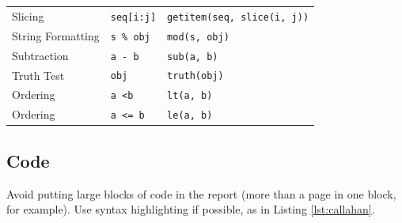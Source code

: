 \documentclass{l4proj}
\begin{document}
\begin{table}[]
\begin{tabular}{@{}lll@{}}
    Slicing               & \texttt{seq{[}i:j{]}}                   & \texttt{getitem(seq, slice(i, j))}                    \\
    String Formatting     & \texttt{s \% obj}                       & \texttt{mod(s, obj)}                                  \\
    Subtraction           & \texttt{a - b}                          & \texttt{sub(a, b)}                                    \\
    Truth Test            & \texttt{obj}                            & \texttt{truth(obj)}                                   \\
    Ordering              & \texttt{a \textless b}                  & \texttt{lt(a, b)}                                     \\
    Ordering              & \texttt{a \textless{}= b}               & \texttt{le(a, b)}                                     \\
    \end{tabular}
    \end{table}
\subsection{Code}

Avoid putting large blocks of code in the report (more than a page in one block, for example). Use syntax highlighting if possible, as in Listing \ref{lst:callahan}.
\end{document}

